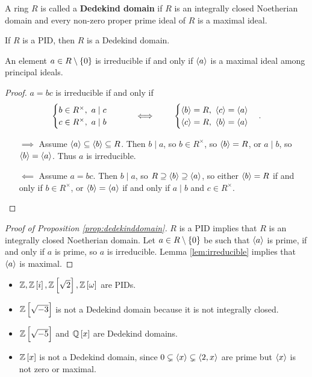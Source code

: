 \begin{definition}
A ring $ R $ is called a \textbf{Dedekind domain} if $ R $ is an integrally closed Noetherian domain and every non-zero proper prime ideal of $ R $ is a maximal ideal.
\end{definition}

\begin{proposition}
\label{prop:dedekinddomain}
If $ R $ is a PID, then $ R $ is a Dedekind domain.
\end{proposition}

\begin{lemma}
\label{lem:irreducible}
An element $ a \in R \setminus \cbr{0} $ is irreducible if and only if $ \left\langle a \right\rangle $ is a maximal ideal among principal ideals.
\end{lemma}

\begin{proof}
$ a = bc $ is irreducible if and only if
$$
\begin{cases}
b \in R^\times, \ a \mid c \\
c \in R^\times, \ a \mid b
\end{cases}
\qquad \iff \qquad
\begin{cases}
\left\langle b \right\rangle = R, \ \left\langle c \right\rangle = \left\langle a \right\rangle \\
\left\langle c \right\rangle = R, \ \left\langle b \right\rangle = \left\langle a \right\rangle
\end{cases}.
$$
\begin{itemize}
\item[$ \implies $] Assume $ \left\langle a \right\rangle \subseteq \left\langle b \right\rangle \subseteq R $. Then $ b \mid a $, so $ b \in R^\times $, so $ \left\langle b \right\rangle = R $, or $ a \mid b $, so $ \left\langle b \right\rangle = \left\langle a \right\rangle $. Thus $ a $ is irreducible.
\item[$ \impliedby $] Assume $ a = bc $. Then $ b \mid a $, so $ R \supseteq \left\langle b \right\rangle \supseteq \left\langle a \right\rangle $, so either $ \left\langle b \right\rangle = R $ if and only if $ b \in R^\times $, or $ \left\langle b \right\rangle = \left\langle a \right\rangle $ if and only if $ a \mid b $ and $ c \in R^\times $.
\end{itemize}
\end{proof}

\begin{proof}[Proof of Proposition \ref{prop:dedekinddomain}]
$ R $ is a PID implies that $ R $ is an integrally closed Noetherian domain. Let $ a \in R \setminus \cbr{0} $ be such that $ \left\langle a \right\rangle $ is prime, if and only if $ a $ is prime, so $ a $ is irreducible. Lemma \ref{lem:irreducible} implies that $ \left\langle a \right\rangle $ is maximal.
\end{proof}

\begin{example*}
\hfill
\begin{itemize}
\item $ \Z, \Z\sbr{i}, \Z\sbr{\sqrt{2}}, \Z\sbr{\omega} $ are PIDs.
\item $ \Z\sbr{\sqrt{-3}} $ is not a Dedekind domain because it is not integrally closed.
\item $ \Z\sbr{\sqrt{-5}} $ and $ \Q\sbr{x} $ are Dedekind domains.
\item $ \Z\sbr{x} $ is not a Dedekind domain, since $ 0 \subsetneq \left\langle x \right\rangle \subsetneq \left\langle 2, x \right\rangle $ are prime but $ \left\langle x \right\rangle $ is not zero or maximal.
\end{itemize}
\end{example*}

